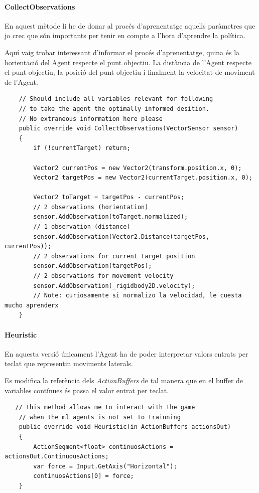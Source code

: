 \documentclass{article}
\begin{document}
    \paragraph{CollectObservations}
    
    En aquest mètode li he de donar al procés d'aprenentatge aquells paràmetres que jo crec que són importants per tenir en compte a l'hora d'aprendre la política.

    Aquí vaig trobar interessant d'informar el procés d'aprenentatge, quina és la horientació del Agent respecte el punt objectiu. La distància de l'Agent respecte el punt objectiu, la posició del punt objectiu i finalment la velocitat de moviment de l'Agent.
    
    \begin{lstlisting}
    // Should include all variables relevant for following 
    // to take the agent the optimally informed desition.
    // No extraneous information here please
    public override void CollectObservations(VectorSensor sensor)
    {
        if (!currentTarget) return;

        Vector2 currentPos = new Vector2(transform.position.x, 0);
        Vector2 targetPos = new Vector2(currentTarget.position.x, 0);

        Vector2 toTarget = targetPos - currentPos;
        // 2 observations (horientation)
        sensor.AddObservation(toTarget.normalized);
        // 1 observation (distance)
        sensor.AddObservation(Vector2.Distance(targetPos, currentPos));
        // 2 observations for current target position
        sensor.AddObservation(targetPos);
        // 2 observations for movement velocity
        sensor.AddObservation(_rigidbody2D.velocity);
        // Note: curiosamente si normalizo la velocidad, le cuesta mucho aprenderx
    }
    \end{lstlisting}
   
   \newpage
   
   \paragraph{Heuristic}
   En aquesta versió únicament l'Agent ha de poder interpretar valors entrats per teclat que representin moviments laterals.
    
    Es modifica la referència dels \textit{ActionBuffers} de tal manera que en el buffer de variables contínues és passa el valor entrat per teclat. \\
   
   \begin{lstlisting}
   // this method allows me to interact with the game
    // when the ml agents is not set to trainning
    public override void Heuristic(in ActionBuffers actionsOut)
    {
        ActionSegment<float> continuosActions = actionsOut.ContinuousActions;
        var force = Input.GetAxis("Horizontal");
        continuosActions[0] = force;
    }
   \end{lstlisting}
   
\end{document}
